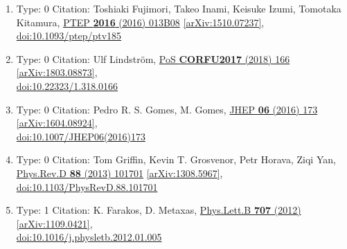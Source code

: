 \documentclass[a4paper,10pt]{article}
\begin{document}
\begin{enumerate}
\begin{enumerate}
  \item Type: 0 Citation: Toshiaki Fujimori, Takeo Inami, Keisuke Izumi, Tomotaka Kitamura, \href{https://www.doi.org/10.1093/ptep/ptv185}{PTEP {\bf 2016} (2016) 013B08}  \href{https://arxiv.org/abs/1510.07237}{[arXiv:1510.07237]},\\\href{https://www.doi.org/10.1093/ptep/ptv185}{doi:10.1093/ptep/ptv185}
  \item Type: 0 Citation: Ulf Lindström, \href{https://www.doi.org/10.22323/1.318.0166}{PoS {\bf CORFU2017} (2018) 166}  \href{https://arxiv.org/abs/1803.08873}{[arXiv:1803.08873]},\\\href{https://www.doi.org/10.22323/1.318.0166}{doi:10.22323/1.318.0166}
  \item Type: 0 Citation: Pedro R. S. Gomes, M. Gomes, \href{https://www.doi.org/10.1007/JHEP06(2016)173}{JHEP {\bf 06} (2016) 173}  \href{https://arxiv.org/abs/1604.08924}{[arXiv:1604.08924]},\\\href{https://www.doi.org/10.1007/JHEP06(2016)173}{doi:10.1007/JHEP06(2016)173}
  \item Type: 0 Citation: Tom Griffin, Kevin T. Grosvenor, Petr Horava, Ziqi Yan, \href{https://www.doi.org/10.1103/PhysRevD.88.101701}{Phys.Rev.D {\bf 88} (2013) 101701}  \href{https://arxiv.org/abs/1308.5967}{[arXiv:1308.5967]},\\\href{https://www.doi.org/10.1103/PhysRevD.88.101701}{doi:10.1103/PhysRevD.88.101701}
  \item Type: 1 Citation: K. Farakos, D. Metaxas, \href{https://www.doi.org/10.1016/j.physletb.2012.01.005}{Phys.Lett.B {\bf 707} (2012) }  \href{https://arxiv.org/abs/1109.0421}{[arXiv:1109.0421]},\\\href{https://www.doi.org/10.1016/j.physletb.2012.01.005}{doi:10.1016/j.physletb.2012.01.005}

\end{enumerate}
\end{enumerate}
\end{document}
